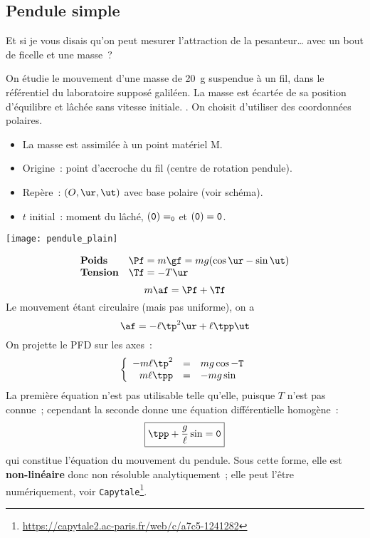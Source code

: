 \documentclass[../../main/main.tex]{subfiles}
\begin{document}
\subsection{Pendule simple}
Et si je vous disais qu'on peut mesurer l'attraction de la pesanteur… avec un
bout de ficelle et une masse~?
\bigbreak

\hspace*{-0.75cm}
\begin{minipage}{0.70\linewidth}
	\begin{enumerate}[label=\sqenumi]
		 On étudie le mouvement d'une masse de
		\SI{20}{g} suspendue à un fil, dans le référentiel du laboratoire
		supposé galiléen. La masse est écartée de sa position d'équilibre et
		lâchée sans vitesse initiale.
		.
		 On choisit d'utiliser des coordonnées polaires.
		\begin{itemize}
			\item La masse est assimilée à un point matériel M.
			\item Origine~: point d'accroche du fil (centre de rotation
			      pendule).
			\item Repère~: $(O,\ur,\ut)$ avec base polaire (voir schéma).
			\item $t$ initial~: moment du lâché, $\tt(0) = \tt_0$ et
			      $\tt(0) = 0$.
		\end{itemize}
	\end{enumerate}
\end{minipage}
\hfill
\begin{minipage}{0.25\linewidth}
	\begin{center}
		\texttt{[image: pendule\_plain]}
	\end{center}
\end{minipage}
\begin{enumerate}[label=\sqenumi, start=4]
	\[
		\begin{array}{ll}
			\textbf{Poids}   & \Pf = m\gf = mg(\cos\tt \ur - \sin\tt \ut) \\
			\textbf{Tension} & \Tf = -T\ur
		\end{array}
	\]
	\[m\af = \Pf + \Tf\]
	Le mouvement étant circulaire (mais pas uniforme), on a
	\[\af = -\ell\tp^2 \ur + \ell\tpp \ut\]
	 On projette le PFD sur les axes~:
	\[
		\left\{
		\begin{array}{rcl}
			-m\ell\tp^2 & = & mg\cos\tt - T \\
			m\ell\tpp   & = & -mg\sin\tt
		\end{array}
		\right.
	\]
	 La première équation n'est pas utilisable telle qu'elle,
	puisque $T$ n'est pas connue~; cependant la seconde donne une équation
	différentielle homogène~:
	\[\boxed{\tpp + \frac{g}{\ell}\sin\tt = 0}\]
	qui constitue l'équation du mouvement du pendule. Sous cette forme, elle
	est \textbf{non-linéaire} donc non résoluble analytiquement~; elle peut
	l'être numériquement, voir
	\texttt{Capytale}\footnote{\url{
			https://capytale2.ac-paris.fr/web/c/a7c5-1241282}}.
\end{enumerate}
\end{document}
